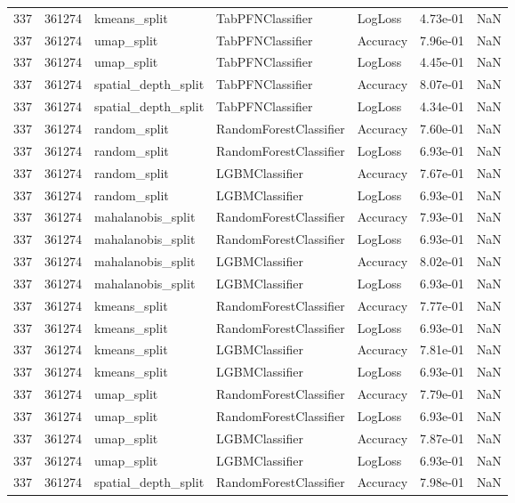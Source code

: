 \begin{tabular}{rrlllrr}
337 & 361274 & kmeans\_split & TabPFNClassifier & LogLoss & 4.73e-01 & NaN \\
337 & 361274 & umap\_split & TabPFNClassifier & Accuracy & 7.96e-01 & NaN \\
337 & 361274 & umap\_split & TabPFNClassifier & LogLoss & 4.45e-01 & NaN \\
337 & 361274 & spatial\_depth\_split & TabPFNClassifier & Accuracy & 8.07e-01 & NaN \\
337 & 361274 & spatial\_depth\_split & TabPFNClassifier & LogLoss & 4.34e-01 & NaN \\
337 & 361274 & random\_split & RandomForestClassifier & Accuracy & 7.60e-01 & NaN \\
337 & 361274 & random\_split & RandomForestClassifier & LogLoss & 6.93e-01 & NaN \\
337 & 361274 & random\_split & LGBMClassifier & Accuracy & 7.67e-01 & NaN \\
337 & 361274 & random\_split & LGBMClassifier & LogLoss & 6.93e-01 & NaN \\
337 & 361274 & mahalanobis\_split & RandomForestClassifier & Accuracy & 7.93e-01 & NaN \\
337 & 361274 & mahalanobis\_split & RandomForestClassifier & LogLoss & 6.93e-01 & NaN \\
337 & 361274 & mahalanobis\_split & LGBMClassifier & Accuracy & 8.02e-01 & NaN \\
337 & 361274 & mahalanobis\_split & LGBMClassifier & LogLoss & 6.93e-01 & NaN \\
337 & 361274 & kmeans\_split & RandomForestClassifier & Accuracy & 7.77e-01 & NaN \\
337 & 361274 & kmeans\_split & RandomForestClassifier & LogLoss & 6.93e-01 & NaN \\
337 & 361274 & kmeans\_split & LGBMClassifier & Accuracy & 7.81e-01 & NaN \\
337 & 361274 & kmeans\_split & LGBMClassifier & LogLoss & 6.93e-01 & NaN \\
337 & 361274 & umap\_split & RandomForestClassifier & Accuracy & 7.79e-01 & NaN \\
337 & 361274 & umap\_split & RandomForestClassifier & LogLoss & 6.93e-01 & NaN \\
337 & 361274 & umap\_split & LGBMClassifier & Accuracy & 7.87e-01 & NaN \\
337 & 361274 & umap\_split & LGBMClassifier & LogLoss & 6.93e-01 & NaN \\
337 & 361274 & spatial\_depth\_split & RandomForestClassifier & Accuracy & 7.98e-01 & NaN \\

\end{tabular}
